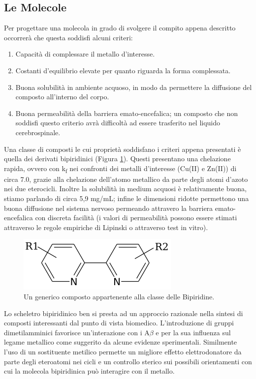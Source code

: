 \documentclass[a4paper, 12pt]{article}
\begin{document}
\subsection{Le Molecole}
\label{sec:bpy_mol}
Per progettare una molecola in grado di svolgere il compito appena descritto occorrerà che questa soddisfi alcuni criteri:
\begin{enumerate}
	\item Capacità di complessare il metallo d'interesse.
	\item Costanti d'equilibrio elevate per quanto riguarda la forma complessata.
	\item Buona solubilità in ambiente acquoso, in modo da permettere la diffusione del composto all'interno del corpo.
	\item Buona permeabilità della barriera emato-encefalica; un composto che non soddisfi questo criterio avrà difficoltà ad essere trasferito nel liquido cerebrospinale.
\end{enumerate}
Una classe di composti le cui proprietà soddisfano i criteri appena presentati è quella dei derivati bipiridinici (Figura \ref{fig:bpy}).
Questi presentano una chelazione rapida, ovvero con k\textsubscript{f} nei confronti dei metalli d'interesse (Cu(II) e Zn(II)) di circa 7.0, grazie alla chelazione dell'atomo metallico da parte degli atomi d'azoto nei due eterocicli. Inoltre la solubilità in medium acquosi è relativamente buona, stiamo parlando di circa 5,9 mg/mL; infine le dimensioni ridotte permettono una buona diffusione nel sistema nervoso permeando attravero la barriera emato-encefalica con discreta facilità (i valori di permeabilità possono essere stimati attraverso le regole empiriche di Lipinski o attraverso test in vitro). \cite{di_high_2003}
\begin{figure}[H]
	\centering
	\includegraphics[width=.5\linewidth]{immagini/bpy.png}
	\caption{Un generico composto appartenente alla classe delle Bipiridine.}
	\label{fig:bpy}
\end{figure}
Lo scheletro bipiridinico ben si presta ad un approccio razionale nella sintesi di composti interessanti dal punto di vista biomedico.
L'introduzione di gruppi dimetilamminici favorisce un'interazione con i A$\beta$ e per la sua influenza sul legame metallico come suggerito da alcune evidenze sperimentali. Similmente l'uso di un sostituente metilico permette un migliore effetto elettrodonatore da parte degli eteroatomi nei cicli e un controllo sterico sui possibili orientamenti con cui la molecola bipiridinica può interagire con il metallo. \cite{derrick_importance_2016,savelieff_ongoing_2014}
\end{document}
